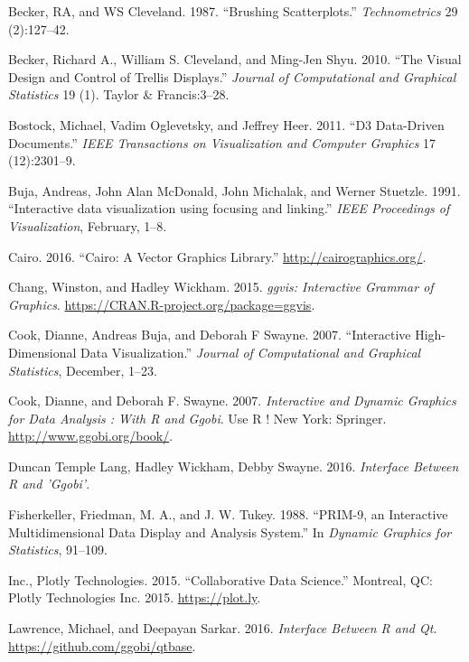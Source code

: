 \documentclass[12pt,]{article}
\theoremstyle{definition}
\theoremstyle{definition}
\theoremstyle{definition}
\theoremstyle{remark}
\begin{document}
\leavevmode\hypertarget{ref-brushing-scatterplots}{}%
Becker, RA, and WS Cleveland. 1987. ``Brushing Scatterplots.''
\emph{Technometrics} 29 (2):127--42.

\leavevmode\hypertarget{ref-trellis}{}%
Becker, Richard A., William S. Cleveland, and Ming-Jen Shyu. 2010. ``The
Visual Design and Control of Trellis Displays.'' \emph{Journal of
Computational and Graphical Statistics} 19 (1). Taylor \& Francis:3--28.

\leavevmode\hypertarget{ref-d3}{}%
Bostock, Michael, Vadim Oglevetsky, and Jeffrey Heer. 2011. ``D3
Data-Driven Documents.'' \emph{IEEE Transactions on Visualization and
Computer Graphics} 17 (12):2301--9.

\leavevmode\hypertarget{ref-Buja:1991vh}{}%
Buja, Andreas, John Alan McDonald, John Michalak, and Werner Stuetzle.
1991. ``Interactive data visualization using focusing and linking.''
\emph{IEEE Proceedings of Visualization}, February, 1--8.

\leavevmode\hypertarget{ref-cairo}{}%
Cairo. 2016. ``Cairo: A Vector Graphics Library.''
\url{http://cairographics.org/}.

\leavevmode\hypertarget{ref-ggvis}{}%
Chang, Winston, and Hadley Wickham. 2015. \emph{ggvis: Interactive
Grammar of Graphics}. \url{https://CRAN.R-project.org/package=ggvis}.

\leavevmode\hypertarget{ref-Cook:2007uk}{}%
Cook, Dianne, Andreas Buja, and Deborah F Swayne. 2007. ``Interactive
High-Dimensional Data Visualization.'' \emph{Journal of Computational
and Graphical Statistics}, December, 1--23.

\leavevmode\hypertarget{ref-ggobi:2007}{}%
Cook, Dianne, and Deborah F. Swayne. 2007. \emph{Interactive and Dynamic
Graphics for Data Analysis : With R and Ggobi}. Use R ! New York:
Springer. \url{http://www.ggobi.org/book/}.

\leavevmode\hypertarget{ref-rggobi}{}%
Duncan Temple Lang, Hadley Wickham, Debby Swayne. 2016. \emph{Interface
Between R and 'Ggobi'}.

\leavevmode\hypertarget{ref-PRIM9}{}%
Fisherkeller, Friedman, M. A., and J. W. Tukey. 1988. ``PRIM-9, an
Interactive Multidimensional Data Display and Analysis System.'' In
\emph{Dynamic Graphics for Statistics}, 91--109.

\leavevmode\hypertarget{ref-plotly}{}%
Inc., Plotly Technologies. 2015. ``Collaborative Data Science.''
Montreal, QC: Plotly Technologies Inc. 2015. \url{https://plot.ly}.

\leavevmode\hypertarget{ref-qtbase}{}%
Lawrence, Michael, and Deepayan Sarkar. 2016. \emph{Interface Between R
and Qt}. \url{https://github.com/ggobi/qtbase}.
\end{document}
